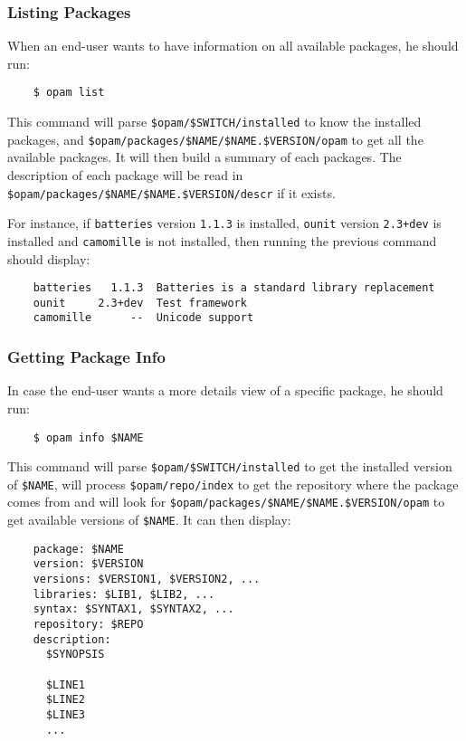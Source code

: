 \documentclass[a4paper,10pt]{article}
\begin{document}
\subsubsection{Listing Packages}
\label{opam-list}

When an end-user wants to have information on all available packages,
he should run:

\begin{verbatim}
    $ opam list
\end{verbatim}

This command will parse \verb+$opam/$SWITCH/installed+ to know the
installed packages, and
\verb+$opam/packages/$NAME/$NAME.$VERSION/opam+ to get all the
available packages. It will then build a summary of each packages. The
description of each package will be read in
\verb+$opam/packages/$NAME/$NAME.$VERSION/descr+ if it exists.

For instance, if {\tt batteries} version {\tt 1.1.3} is installed,
{\tt ounit} version {\tt 2.3+dev} is installed and {\tt camomille} is
not installed, then running the previous command should display:

\begin{verbatim}
    batteries   1.1.3  Batteries is a standard library replacement
    ounit     2.3+dev  Test framework
    camomille      --  Unicode support
\end{verbatim}

\subsubsection{Getting Package Info}

In case the end-user wants a more details view of a specific package,
he should run:

\begin{verbatim}
    $ opam info $NAME
\end{verbatim}

This command will parse \verb+$opam/$SWITCH/installed+ to get the
installed version of \verb+$NAME+, will process
\verb+$opam/repo/index+ to get the repository where the package comes
from and will look for \verb+$opam/packages/$NAME/$NAME.$VERSION/opam+
to get available versions of \verb+$NAME+. It can then display:

\begin{verbatim}
    package: $NAME
    version: $VERSION
    versions: $VERSION1, $VERSION2, ...
    libraries: $LIB1, $LIB2, ...
    syntax: $SYNTAX1, $SYNTAX2, ...
    repository: $REPO
    description:
      $SYNOPSIS

      $LINE1
      $LINE2
      $LINE3
      ...
\end{verbatim}
\end{document}
